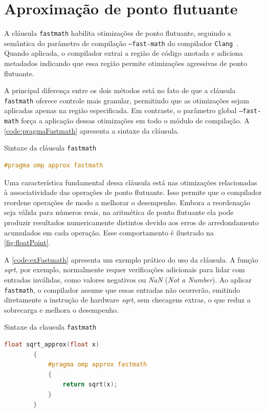 \section{Aproximação de ponto flutuante}\label{subsec:pragmaFastmath}

A cláusula \texttt{fastmath} habilita otimizações de ponto flutuante, seguindo a semântica do parâmetro de compilação \texttt{--fast-math} do compilador \texttt{Clang}~\cite{clangffast}. Quando aplicada, o compilador extrai a região de código anotada e adiciona metadados indicando que essa região permite otimizações agressivas de ponto flutuante.

A principal diferença entre os dois métodos está no fato de que a cláusula \texttt{fastmath} oferece controle mais granular, permitindo que as otimizações sejam aplicadas apenas na região especificada. Em contraste, o parâmetro global \texttt{--fast-math} força a aplicação dessas otimizações em todo o módulo de compilação. A \autoref{code:pragmaFastmath} apresenta a sintaxe da cláusula.

\begin{sourcecode}[htb]\caption{\label{code:pragmaFastmath}Sintaxe da cláusula \texttt{fastmath}}
    \begin{lstlisting}[frame=single, language=C++]
        #pragma omp approx fastmath
    \end{lstlisting}
    \fonte{}
\end{sourcecode}
Uma característica fundamental dessa cláusula está nas otimizações relacionadas à associatividade das operações de ponto flutuante. Isso permite que o compilador reordene operações de modo a melhorar o desempenho. Embora a reordenação seja válida para números reais, na aritmética de ponto flutuante ela pode produzir resultados numericamente distintos devido aos erros de arredondamento acumulados em cada operação. Esse comportamento é ilustrado na \autoref{fig:floatPoint}.

A \autoref{code:exFastmath} apresenta um exemplo prático do uso da cláusula. A função \textit{sqrt}, por exemplo, normalmente requer verificações adicionais para lidar com entradas inválidas, como valores negativos ou \textit{NaN} (\textit{Not a Number}). Ao aplicar \texttt{fastmath}, o compilador assume que essas entradas não ocorrerão, emitindo diretamente a instrução de hardware \textit{sqrt}, sem checagens extras, o que reduz a sobrecarga e melhora o desempenho.

\begin{sourcecode}[htb]\caption{\label{code:exFastmath}Sintaxe da clausula \texttt{fastmath}}
    \begin{lstlisting}[frame=single, language=C++]
        float sqrt_approx(float x)
        {
            #pragma omp approx fastmath
            {
                return sqrt(x);
            }
        }
    \end{lstlisting}
    \fonte{}
\end{sourcecode}

